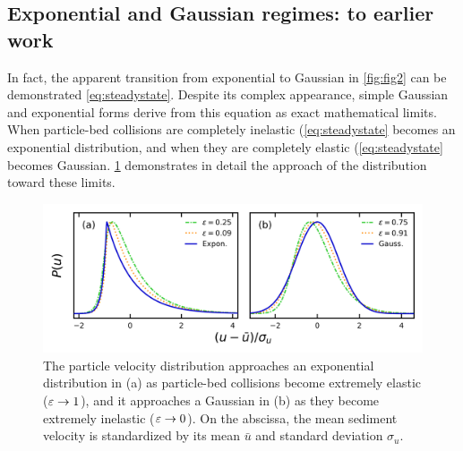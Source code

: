 \subsection{Exponential and Gaussian regimes: \DIFdelbegin {}\DIFdelend \DIFaddbegin {}\DIFaddend to earlier work}
\label{sec:langmodelcomparison}

In fact, the apparent transition from exponential to Gaussian in \DIFdelbegin {}\DIFdelend \DIFaddbegin {}\DIFaddend \ref{fig:fig2} can be demonstrated \DIFdelbegin {}\DIFdelend \DIFaddbegin {}\DIFaddend \ref{eq:steadystate}. Despite its complex appearance, simple Gaussian and exponential forms derive from this equation as exact mathematical limits.
When particle-bed collisions are completely inelastic (\DIFdelbegin {}\DIFdelend \DIFaddbegin {}\DIFaddend \ref{eq:steadystate} becomes an exponential distribution, and when they are completely elastic (\DIFdelbegin {}\DIFdelend \DIFaddbegin {}\DIFaddend \ref{eq:steadystate} becomes Gaussian.
\DIFdelbegin {}\DIFdelend \DIFaddbegin {}\DIFaddend \ref{fig:fig3} demonstrates in detail the approach of the distribution toward these limits.
\begin{figure}
	\centerline{\includegraphics{./figures/ch5/Fig3asymptotic.png}}
	\caption{The particle velocity distribution approaches an exponential distribution in \DIFaddbeginFL {}\DIFaddendFL (a) as particle-bed collisions become extremely elastic ($\varepsilon \rightarrow 1$), and it approaches a Gaussian in \DIFaddbeginFL {}\DIFaddendFL (b) as they become extremely inelastic ($\varepsilon \rightarrow 0$). On the abscissa, the mean sediment velocity is standardized by its mean $\bar{u}$ and standard deviation $\sigma_u$. }
	\label{fig:fig3}
\end{figure}

